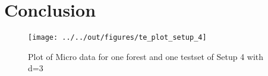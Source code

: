 \documentclass[11pt, a4paper, leqno]{article}
\begin{document}









\section{Conclusion} %
\label{sec:conclusion}


\begin{figure}
    \caption{Plot of Micro data for one forest and one testset of Setup 4 with d=3}
    
    \texttt{[image: ../../out/figures/te\_plot\_setup\_4]}

\end{figure}




\pagebreak










\end{document}
